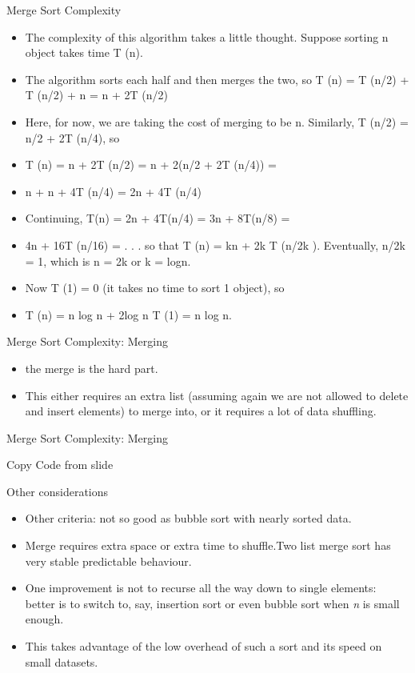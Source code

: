 \documentclass{beamer}
\begin{document}
\begin{frame} 

Merge Sort Complexity

\begin{itemize}
\item The complexity of this algorithm takes a little thought. Suppose sorting n object takes time T (n).
\item The algorithm sorts each half and then merges the two, so T (n) = T (n/2) + T (n/2) + n = n + 2T (n/2)
\item Here, for now, we are taking the cost of merging to be n. Similarly, T (n/2) = n/2 + 2T (n/4), so
\item T (n) = n + 2T (n/2) = n + 2(n/2 + 2T (n/4)) =
\item n + n + 4T (n/4) = 2n + 4T (n/4)
\item Continuing, T(n) = 2n + 4T(n/4) = 3n + 8T(n/8) =
\item 4n + 16T (n/16) = . . . so that T (n) = kn + 2k T (n/2k ). Eventually, n/2k = 1, which is n = 2k or k = logn.
\item Now T (1) = 0 (it takes no time to sort 1 object), so
\item T (n) = n log n + 2log n T (1) = n log n.
\end{itemize}

\end{frame} \begin{frame}

Merge Sort Complexity: Merging

\begin{itemize}
\item the merge is the hard part.
\item This either requires an extra list (assuming again we are not allowed to delete and insert elements) to merge
into, or it requires a lot of data shuffling.
\end{itemize}

\end{frame} \begin{frame}

Merge Sort Complexity: Merging

Copy Code from slide

\end{frame} \begin{frame}

Other considerations

\begin{itemize}
\item Other criteria: not so good as bubble sort with nearly sorted data.
\item Merge requires extra space or extra time to shuffle.Two list merge sort has very stable predictable
behaviour.
\item One improvement is not to recurse all the way down to single elements: better is to switch to, say, insertion sort
or even bubble sort when \textit{n }is small enough.
\item This takes advantage of the low overhead of such a sort and its speed on small datasets.
\end{itemize}


\end{frame}
\end{document}
